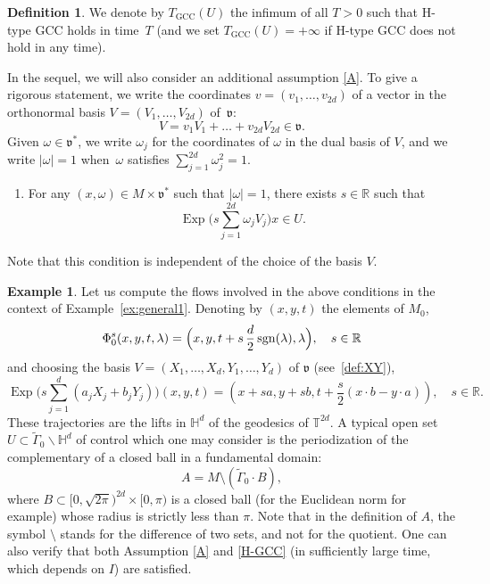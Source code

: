 \documentclass[JEP,XML,SOM,Unicode,published]{cedram}
\newcommand{\GCC}{\mathrm{GCC}}
\DeclareMathOperator{\Exp}{Exp}
\DeclareMathOperator{\sgn}{sgn}
\theoremstyle{plain}
\theoremstyle{definition}
\newtheorem{definition}[theorem]{Definition}
\newtheorem{example}[theorem]{Example}
\def\R{{\mathbb R}}
\def\T{{\mathbb T}}
\def\bbH{{\mathbb H}}
\begin{document}
\begin{definition}
We denote by $T_\GCC(U)$ the infimum of all $T>0$ such that H-type GCC holds in time~$T$ (and we set $T_\GCC(U)=+\infty$ if H-type GCC does not hold in any time).
\end{definition}

In the sequel, we will also consider an additional assumption \eqref{A}.
To give a rigorous statement, we write the coordinates $v=(v_1,\ldots,v_{2d})$ of a vector in the orthonormal basis $V=(V_1,\ldots, V_{2d})$ of~$\mathfrak v$:
\[
V=v_1V_1 +\ldots + v_{2d} V_{2d}\in \mathfrak v.
\]
Given $\omega\in\mathfrak v^*$, we write $\omega_j$ for the coordinates of $\omega$ in the dual basis of $V$, and we write $|\omega|=1$ when~$\omega$ satisfies $\sum_{j=1}^{2d}\omega_j^2=1$.
\begin{enumerate}\renewcommand{\theenumi}{A}
\item\label{A}
For any $(x,\omega)\in M\times \mathfrak v^*$ such that $|\omega|=1$, there exists $s\in\R$ such that
\[\textstyle
\Exp \bigl(s\sum_{j=1}^{2d}\omega_jV_j \bigr) x \in U.
\]
\end{enumerate}

Note that this condition is independent of the choice of the basis $V$.

\begin{example}\label{ex:general2}
Let us compute the flows involved in the above conditions in the context of Example~\ref{ex:general1}. Denoting by $(x,y,t)$ the elements of $M_0$,
\[
\Phi^s_0 (x,y,t,\lambda)=\Bigl(x,y, t+s\,\frac d2 \sgn (\lambda), \lambda\Bigr),\quad s\in\R
\]
and choosing the basis $V=(X_1,\dots,X_d,Y_1,\dots, Y_d) $ of $\mathfrak v$ (see~\eqref{def:XY}),
\[\textstyle
\Exp \bigl(s\sum_{j=1}^{d}(a_jX_j +b_jY_j)\bigr) (x,y,t)= \left(x+ sa,y+sb,t+\dfrac s2(x\cdot b-y\cdot a) \right),\quad s\in\R.
\]
These trajectories are the lifts in $\bbH^d$ of the geodesics of $\T^{2d}$.
A typical open set \hbox{$U\subset \widetilde{\Gamma}_0\backslash \bbH^d$} of control which one may consider is the periodization of the complementary of a closed ball in a fundamental domain:
\[
A=M\setminus (\widetilde{\Gamma}_0 \cdot B),
\]
where $B\subset [0,\sqrt{2\pi})^{2d}\times [0,\pi)$ is a closed ball (for the Euclidean norm for example) whose radius is strictly less than $\pi$. Note that in the definition of $A$, the symbol $\setminus$ stands for the difference of two sets, and not for the quotient.
One can also
verify that both Assumption \eqref{A} and \eqref{H-GCC} (in sufficiently large time, which depends on $I$) are satisfied.
\end{example}
\end{document}
